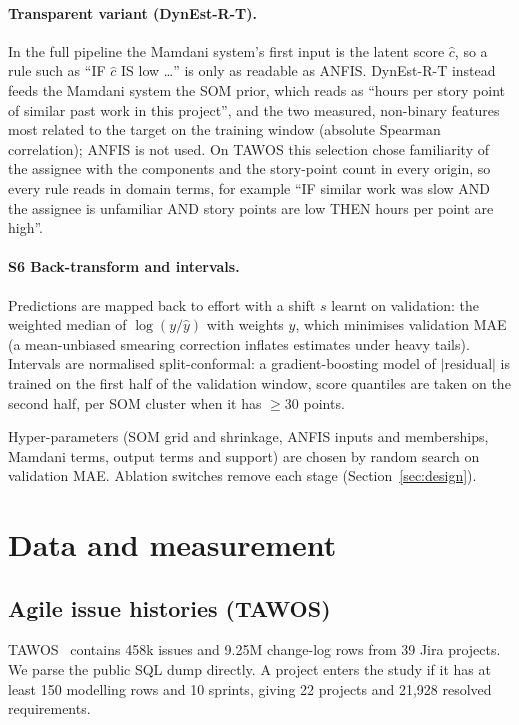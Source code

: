 \documentclass[preprint,12pt,authoryear]{elsarticle}
\newcommand{\dynest}{DynEst-R\xspace}
\begin{document}
\paragraph{Transparent variant (\dynest-T).}  In the full pipeline the Mamdani system's first input is the latent
score $\hat c$, so a rule such as ``IF $\hat c$ IS low \dots'' is only as readable as ANFIS.  \dynest-T instead feeds
the Mamdani system the SOM prior, which reads as ``hours per story point of similar past work in this project'', and
the two measured, non-binary features most related to the target on the training window (absolute Spearman
correlation); ANFIS is not used.  On TAWOS this selection chose familiarity of the assignee with the components and
the story-point count in every origin, so every rule reads in domain terms, for example ``IF similar work was slow AND
the assignee is unfamiliar AND story points are low THEN hours per point are high''.

\paragraph{S6 Back-transform and intervals.}  Predictions are mapped back to effort with a shift $s$ learnt on
validation: the weighted median of $\log(y/\hat y)$ with weights $\hat y$, which minimises validation MAE (a
mean-unbiased smearing correction inflates estimates under heavy tails).  Intervals are normalised split-conformal:
a gradient-boosting model of $|\text{residual}|$ is trained on the first half of the validation window, score quantiles
are taken on the second half, per SOM cluster when it has $\ge$30 points.

Hyper-parameters (SOM grid and shrinkage, ANFIS inputs and memberships, Mamdani terms, output terms and support) are
chosen by random search on validation MAE.  Ablation switches remove each stage (Section~\ref{sec:design}).

\section{Data and measurement}
\label{sec:data}

\subsection{Agile issue histories (TAWOS)}
TAWOS~\citep{tawosi2022tawos} contains 458k issues and 9.25M change-log rows from 39 Jira projects.  We parse the
public SQL dump directly.  A project enters the study if it has at least 150 modelling rows and 10 sprints, giving 22
projects and 21,928 resolved requirements.
\end{document}
